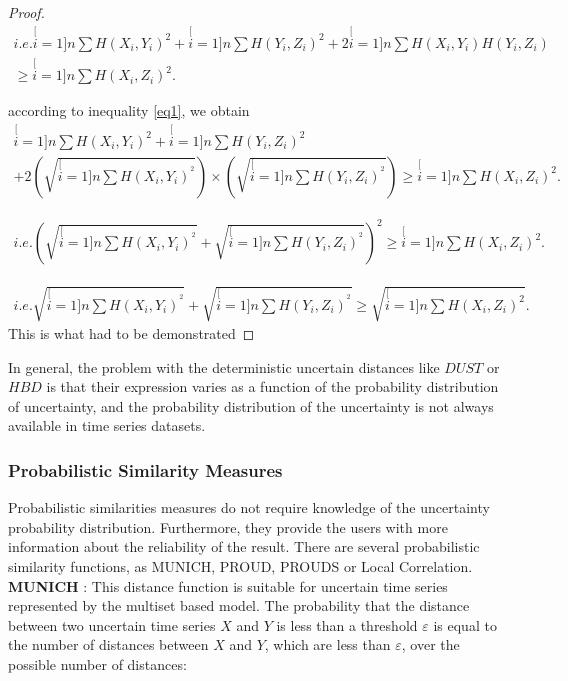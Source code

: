 \begin{proof}
\begin{eqnarray}
i.e.
\stackrel[i=1]{n}{\sum}H(X_{i},Y_{i})^2+\stackrel[i=1]{n}{\sum}H(Y_{i},Z_{i})^2
+ 2\stackrel[i=1]{n}{\sum}H(X_i, Y_i)H(Y_i, Z_i) \\ \geq
\stackrel[i=1]{n}{\sum}H(X_{i},Z_{i})^2.
\end{eqnarray}

according to inequality \ref{eq1}, we obtain
\begin{eqnarray}
\stackrel[i=1]{n}{\sum}H(X_{i},Y_{i})^2+\stackrel[i=1]{n}{\sum}H(Y_{i},Z_{i})^2 \\
+ 2\left( \sqrt{\stackrel[i=1]{n}{\sum}H(X_{i},Y_{i})^{^{2}} }\right)
\times
\left( \sqrt{\stackrel[i=1]{n}{\sum}H(Y_{i},Z_{i})^{^{2}}} \right)
\geq
\stackrel[i=1]{n}{\sum}H(X_{i},Z_{i})^2.
\end{eqnarray}

\begin{eqnarray}
i.e.
\left( \sqrt{\stackrel[i=1]{n}{\sum}H(X_{i},Y_{i})^{^{2}} }
+
\sqrt{\stackrel[i=1]{n}{\sum}H(Y_{i},Z_{i})^{^{2}}} \right)^2
\geq
\stackrel[i=1]{n}{\sum}H(X_{i},Z_{i})^2.
\end{eqnarray}

\begin{eqnarray}
i.e.
 \sqrt{\stackrel[i=1]{n}{\sum}H(X_{i},Y_{i})^{^{2}} }
+
\sqrt{\stackrel[i=1]{n}{\sum}H(Y_{i},Z_{i})^{^{2}}}
\geq
\sqrt{\stackrel[i=1]{n}{\sum}H(X_{i},Z_{i})^2}.
\end{eqnarray}
This is what had to be demonstrated
\end{proof}



In general, the problem with the deterministic uncertain distances like $DUST$ or $HBD$ is that their expression varies as a function of the probability distribution of uncertainty,  and the probability distribution of the uncertainty is not always available in time series datasets.


\subsubsection{Probabilistic Similarity Measures}
Probabilistic similarities measures do not require knowledge of the uncertainty probability distribution. Furthermore, they provide the users with more information about the reliability of the result. There are several probabilistic similarity functions, as MUNICH, PROUD, PROUDS or Local Correlation. 
\\
\textbf{MUNICH} \cite{assfalg2009probabilistic}:
This distance function is suitable for uncertain time series represented by the multiset based model. The probability that the distance between two uncertain time series $X$ and $Y$ is less than a threshold $\varepsilon$ is equal to the number of distances between $X$ and $Y$, which are less than $\varepsilon$, over the possible number of distances:


